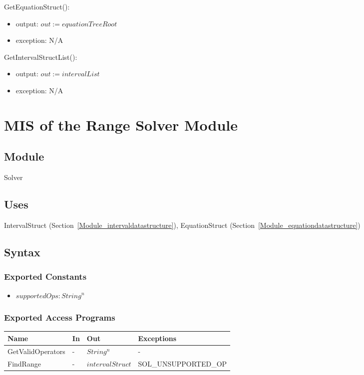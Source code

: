 \documentclass[12pt, titlepage]{article}
\begin{document}
\noindent GetEquationStruct():
\begin{itemize}
	\item output: $out := equationTreeRoot$
	\item exception: N/A
\end{itemize}

\noindent GetIntervalStructList():
\begin{itemize}
	\item output: $out := intervalList$ 
	\item exception: N/A
\end{itemize}

\newpage

\section{MIS of the Range Solver Module} 
\label{Module_rangesolver}

\subsection{Module}

Solver

\subsection{Uses}

IntervalStruct (Section~\ref{Module_intervaldatastructure}), EquationStruct 
(Section~\ref{Module_equationdatastructure})

\subsection{Syntax}

\subsubsection{Exported Constants}

\begin{itemize}
	\item $supportedOps : String^n$
\end{itemize}

\subsubsection{Exported Access Programs}

\begin{center}
	\begin{tabular}{p{3.1cm} p{3cm} p{3cm} p{5cm}}
		\hline
		\textbf{Name} & \textbf{In} & \textbf{Out} & \textbf{Exceptions} \\
		\hline
		GetValidOperators & - & $String^n$ & -\\
		FindRange & - & $intervalStruct$ & SOL\_UNSUPPORTED\_OP\\
		\hline
	\end{tabular}
\end{center}
\end{document}
